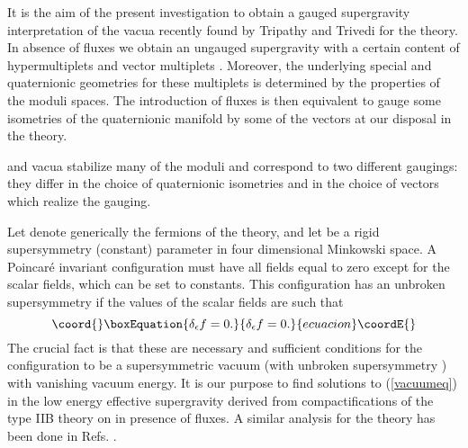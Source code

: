 \documentclass[a4paper,12pt]{article}
\begin{document}
 It is the aim of the present investigation to obtain a gauged supergravity interpretation
 of the \coordHE{} vacua recently found by Tripathy and Trivedi
 \cite{tt} for the \coordHE{} theory.
In absence of fluxes we obtain an ungauged \coordHE{} supergravity with
a certain content of hypermultiplets and vector multiplets
\cite{wlp,adcdffm,dfv,dflv}. Moreover, the underlying special and
quaternionic geometries for these multiplets \cite{wlp,baw} is
determined by the properties of the moduli spaces.  The
introduction of fluxes is then equivalent to gauge some isometries
of the quaternionic manifold by some of the vectors at our
disposal in the theory.

\coordHE{} and \coordHE{} vacua stabilize many of the moduli and correspond
to two different gaugings: they differ in the choice of
quaternionic isometries and in the choice of vectors which realize
the gauging.


Let \coordHE{} denote generically the fermions of the theory, and let
\myHighlight{$\epsilon$}\coordHE{} be a rigid supersymmetry  (constant) parameter in four
dimensional Minkowski space. A Poincar\'e invariant configuration
must have all fields equal to zero except for the scalar fields,
which can be set to constants. This configuration has an unbroken
supersymmetry \myHighlight{$\epsilon$}\coordHE{} if the values of the scalar fields are
such that
\begin{equation}\coord{}\boxEquation{\delta_\epsilon f=0.\label{vacuumeq}}{\delta_\epsilon f=0.}{ecuacion}\coordE{}\end{equation}  The
crucial fact is that these are necessary and sufficient conditions
for the configuration to be a supersymmetric vacuum (with unbroken
supersymmetry \myHighlight{$\epsilon$}\coordHE{})  with vanishing vacuum energy.
It is our purpose to find solutions to (\ref{vacuumeq}) in the low
energy effective \coordHE{} supergravity derived from compactifications
of the type IIB theory on \coordHE{} in presence of
fluxes. A similar analysis for the \coordHE{} theory has been
done in Refs. \cite{dfv,dflv,adflq}.
\end{document}
